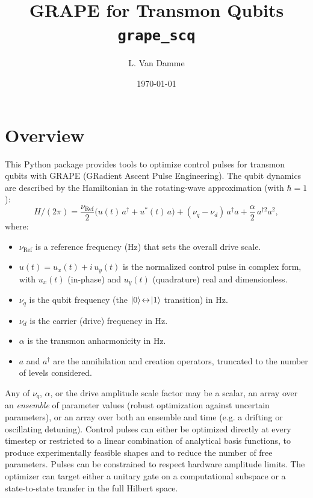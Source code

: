\documentclass[a4paper,12pt]{article}
\title{GRAPE for Transmon Qubits\\ \large \texttt{grape\_scq}}
\author{L. Van Damme}
\date{\today}
\DeclareMathOperator{\R}{Ref}
\begin{document}
\maketitle
\tableofcontents

\newpage
\section*{Overview}
{}
This Python package provides tools to optimize control pulses for transmon
qubits with GRAPE (GRadient Ascent Pulse Engineering). The qubit dynamics
are described by the Hamiltonian in the rotating-wave approximation (with
$\hbar=1$):
\begin{equation}
    H/(2\pi) = \frac{\nu_{\R}}{2}\big( u(t)\,a^{\dagger} + u^{*}(t)\,a \big)
      + (\nu_q - \nu_d)\,a^{\dagger}a
      + \frac{\alpha}{2}\,a^{\dagger 2}a^{2},
\end{equation}
where:
\begin{itemize}
    \item $\nu_{\R}$ is a reference frequency (Hz) that sets the overall drive scale.
    \item $u(t) = u_x(t) + i\,u_y(t)$ is the normalized control pulse in complex form, with $u_x(t)$ (in-phase) and $u_y(t)$ (quadrature) real and dimensionless.
    \item $\nu_q$ is the qubit frequency (the $\ket{0}\!\leftrightarrow\!\ket{1}$ transition) in Hz.
    \item $\nu_d$ is the carrier (drive) frequency in Hz.
    \item $\alpha$ is the transmon anharmonicity in Hz.
    \item $a$ and $a^{\dagger}$ are the annihilation and creation operators, truncated to the number of levels considered.
\end{itemize}

Any of $\nu_q$, $\alpha$, or the drive amplitude scale factor may be a scalar,
an array over an \emph{ensemble} of parameter values (robust optimization
against uncertain parameters), or an array over both an ensemble and time
(e.g. a drifting or oscillating detuning). Control pulses can either be
optimized directly at every timestep or restricted to a linear combination
of analytical basis functions, to produce experimentally feasible shapes and
to reduce the number of free parameters. Pulses can be constrained to
respect hardware amplitude limits. The optimizer can target either a unitary
gate on a computational subspace or a state-to-state transfer in the full
Hilbert space.
\end{document}

